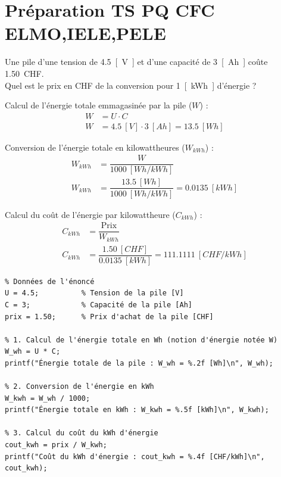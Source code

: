 \documentclass[a4paper,12pt,answers,addpoints]{exam}
\begin{document}
	\unframedsolutions
	\pointsinmargin
	\bracketedpoints
	
\section*{Préparation TS PQ CFC ELMO,IELE,PELE}
\begin{questions}
\question[6] Une pile d'une tension de \qty{4,5}{[V]} et d'une capacité de \qty{3}{[Ah]} coûte \qty{1,50}{CHF}.\\Quel est le prix en CHF de la conversion pour \qty{1}{[kWh]} d'énergie ?

\begin{solution}

Calcul de l'énergie totale emmagasinée par la pile ($W$) :
\begin{align*}
W &= U \cdot C \\[6pt]
W &= \qty{4,5}{[V]} \cdot \qty{3}{[Ah]} = \qty{13,5}{[Wh]}
\end{align*}

Conversion de l'énergie totale en kilowattheures ($W_{kWh}$) :
\begin{align*}
W_{kWh} &= \dfrac{W}{\qty{1000}{[Wh/kWh]}} \\[6pt]
W_{kWh} &= \dfrac{\qty{13,5}{[Wh]}}{\qty{1000}{[Wh/kWh]}} = \qty{0,0135}{[kWh]}
\end{align*}

Calcul du coût de l'énergie par kilowattheure ($C_{kWh}$) :
\begin{align*}
C_{kWh} &= \dfrac{\text{Prix}}{W_{kWh}} \\[6pt]
C_{kWh} &= \dfrac{\qty{1,50}{[CHF]}}{\qty{0,0135}{[kWh]}} = \qty{111,1111}{[CHF/kWh]}
\end{align*}

\begin{verbatim}
% Données de l'énoncé
U = 4.5;          % Tension de la pile [V]
C = 3;            % Capacité de la pile [Ah]
prix = 1.50;      % Prix d'achat de la pile [CHF]

% 1. Calcul de l'énergie totale en Wh (notion d'énergie notée W)
W_wh = U * C;
printf("Énergie totale de la pile : W_wh = %.2f [Wh]\n", W_wh);

% 2. Conversion de l'énergie en kWh
W_kwh = W_wh / 1000;
printf("Énergie totale en kWh : W_kwh = %.5f [kWh]\n", W_kwh);

% 3. Calcul du coût du kWh d'énergie
cout_kwh = prix / W_kwh;
printf("Coût du kWh d'énergie : cout_kwh = %.4f [CHF/kWh]\n", cout_kwh);
\end{verbatim}
\end{solution}
\end{questions}
\end{document}
